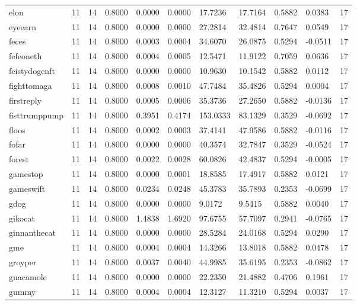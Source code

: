 \begin{table}[htbp]
\begin{tabular}{lllllllllll}
elon & 11 & 14 & 0.8000 & 0.0000 & 0.0000 & 17.7236 & 17.7164 & 0.5882 & 0.0383 & 17 \\
eyeearn & 11 & 14 & 0.8000 & 0.0000 & 0.0000 & 27.2814 & 32.4814 & 0.7647 & 0.0549 & 17 \\
feces & 11 & 14 & 0.8000 & 0.0003 & 0.0004 & 34.6070 & 26.0875 & 0.5294 & -0.0511 & 17 \\
fefeoneth & 11 & 14 & 0.8000 & 0.0004 & 0.0005 & 12.5471 & 11.9122 & 0.7059 & 0.0636 & 17 \\
feistydogenft & 11 & 14 & 0.8000 & 0.0000 & 0.0000 & 10.9630 & 10.1542 & 0.5882 & 0.0112 & 17 \\
fighttomaga & 11 & 14 & 0.8000 & 0.0008 & 0.0010 & 47.7484 & 35.4826 & 0.5294 & 0.0004 & 17 \\
firstreply & 11 & 14 & 0.8000 & 0.0005 & 0.0006 & 35.3736 & 27.2650 & 0.5882 & -0.0136 & 17 \\
fisttrumppump & 11 & 14 & 0.8000 & 0.3951 & 0.4174 & 153.0333 & 83.1329 & 0.3529 & -0.0692 & 17 \\
floos & 11 & 14 & 0.8000 & 0.0002 & 0.0003 & 37.4141 & 47.9586 & 0.5882 & -0.0116 & 17 \\
fofar & 11 & 14 & 0.8000 & 0.0000 & 0.0000 & 40.3574 & 32.7847 & 0.3529 & -0.0524 & 17 \\
forest & 11 & 14 & 0.8000 & 0.0022 & 0.0028 & 60.0826 & 42.4837 & 0.5294 & -0.0005 & 17 \\
gamestop & 11 & 14 & 0.8000 & 0.0000 & 0.0001 & 18.8585 & 17.4917 & 0.5882 & 0.0121 & 17 \\
gameswift & 11 & 14 & 0.8000 & 0.0234 & 0.0248 & 45.3783 & 35.7893 & 0.2353 & -0.0699 & 17 \\
gdog & 11 & 14 & 0.8000 & 0.0000 & 0.0000 & 9.0172 & 9.5415 & 0.5882 & 0.0040 & 17 \\
gikocat & 11 & 14 & 0.8000 & 1.4838 & 1.6920 & 97.6755 & 57.7097 & 0.2941 & -0.0765 & 17 \\
ginnanthecat & 11 & 14 & 0.8000 & 0.0000 & 0.0000 & 28.5284 & 24.0168 & 0.5294 & 0.0290 & 17 \\
gme & 11 & 14 & 0.8000 & 0.0004 & 0.0004 & 14.3266 & 13.8018 & 0.5882 & 0.0478 & 17 \\
groyper & 11 & 14 & 0.8000 & 0.0037 & 0.0040 & 44.9985 & 35.6195 & 0.2353 & -0.0862 & 17 \\
guacamole & 11 & 14 & 0.8000 & 0.0000 & 0.0000 & 22.2350 & 21.4882 & 0.4706 & 0.1961 & 17 \\
gummy & 11 & 14 & 0.8000 & 0.0004 & 0.0004 & 12.3127 & 11.3210 & 0.5294 & 0.0037 & 17 \\

\end{tabular}
\end{table}
